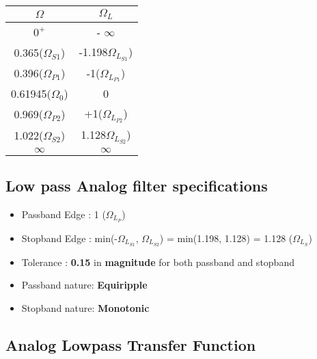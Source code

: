 \documentclass{article}
\begin{document}
\begin{table}[H]
		\begin{center}
		\begin{tabular}{|c|c|}
			\hline
			$\Omega$ & $\Omega_L$\\
			
			\hline
                $0^+$ & - $\infty$\\
                \hline
                0.365($\Omega_{S1}$) & -1.198$\Omega_{L_{S1}}$)\\
                \hline
                0.396($\Omega_{P1}$) & -1($\Omega_{L_{P1}}$)\\
                \hline
                0.61945($\Omega_0$) & 0\\
                \hline
                0.969($\Omega_{P2}$) & +1($\Omega_{L_{P2}}$) \\
                \hline
                1.022($\Omega_{S2}$) & 1.128$\Omega_{L_{S2}}$)\\
                \hline
                $\infty$ & $\infty$\\
                \hline
            
		\end{tabular}
		\end{center}
\end{table}

\subsection{Low pass Analog filter specifications}

\begin{itemize}
    \item Passband Edge : 1 ($\Omega_{L_{P}}$)
    \item Stopband Edge : min(-$\Omega_{L_{S1}}$, $\Omega_{L_{S2}}$) = min(1.198, 1.128) = 1.128 ($\Omega_{L_{S}}$)
    \item  Tolerance : \textbf{0.15} in \textbf{magnitude} for both passband and stopband
    \item Passband nature: \textbf{Equiripple}
    \item Stopband nature: \textbf{Monotonic}
\end{itemize}

\subsection{Analog Lowpass Transfer Function}
\end{document}
